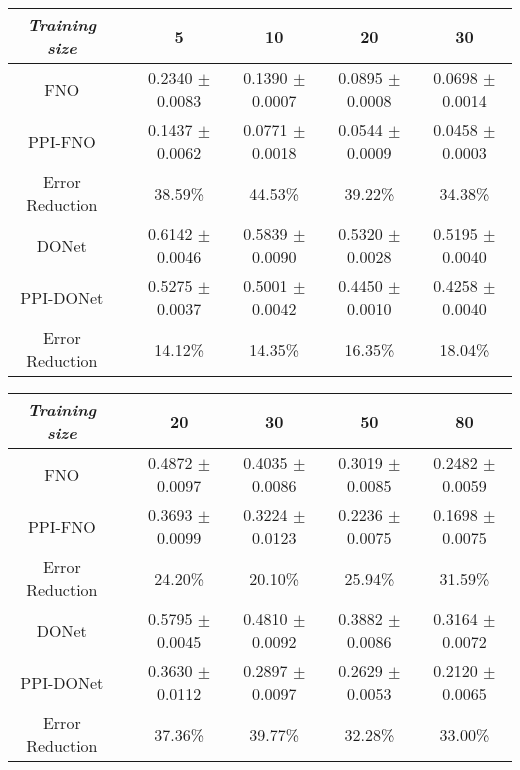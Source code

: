 \begin{table*}[t]
    \begin{subtable}{\textwidth}
    \small 
    \centering
    \begin{tabular}{cccccc}
        \hline
        \textit{Training size}      &  & {5}             & {10}         & {20}     & {30}     \\ \hline
        FNO                  &  & 0.2340 $\pm$ 0.0083	& 0.1390 $\pm$ 0.0007   & 0.0895 $\pm$ 0.0008   & 0.0698 $\pm$ 0.0014         \\
        PPI-FNO          &  & {0.1437} $\pm$ {0.0062}          & {0.0771} $\pm$ {0.0018}        & {0.0544} $\pm$ {0.0009} 		 & {0.0458} $\pm$ {0.0003}    \\
        Error Reduction          &  & 38.59\% & 44.53\%        & 39.22\%		 & 34.38\%   \\ \hline
        DONet             &  & 0.6142 $\pm$ 0.0046          & 0.5839 $\pm$ 0.0090      & 0.5320 $\pm$ 0.0028 	& 0.5195 $\pm$ 0.0040    \\
        PPI-DONet             &  & 0.5275 $\pm$ 0.0037        & 0.5001 $\pm$ 0.0042    	& 0.4450 $\pm$ 0.0010	& 0.4258 $\pm$ 0.0040  \\ 
        Error Reduction  &  & 14.12\%         & 14.35\%    	& 16.35\%	& 18.04\%  \\ \hline
    \end{tabular}
    \caption{\small \textit{Poisson}}
    \label{tab:poisson}
    \end{subtable}
    \begin{subtable}{\textwidth}
        \small 
        \centering
    \begin{tabular}{cccccc}
        \hline
        \textit{Training size}      &  & {20}             & {30}         & {50}     & {80}     \\ \hline
        FNO                  &  & 0.4872 $\pm$ 0.0097	& 0.4035 $\pm$ 0.0086   & 0.3019 $\pm$ 0.0085   & 0.2482 $\pm$ 0.0059        \\
        PPI-FNO          &  & {0.3693} $\pm$ {0.0099}          & {0.3224} $\pm$ {0.0123}        & {0.2236} $\pm$ {0.0075} 		 & {0.1698} $\pm$ {0.0075}    \\
        Error Reduction          &  & 24.20\% & 20.10\%        & 25.94\%		 & 31.59\%   \\ \hline
        DONet             &  & 0.5795 $\pm$ 0.0045          & 0.4810 $\pm$ 0.0092      & 0.3882 $\pm$ 0.0086 	& 0.3164 $\pm$ 0.0072    \\
        PPI-DONet             &  & 0.3630 $\pm$ 0.0112        & 0.2897 $\pm$ 0.0097    	& 0.2629 $\pm$ 0.0053	& 0.2120 $\pm$ 0.0065  \\ 
        Error Reduction  &  & 37.36\%         & 39.77\%    	& 32.28\%	& 33.00\%  \\ \hline
    \end{tabular}
    \caption{\small \textit{Advection}}
    \label{tab:advection}
    \end{subtable}
    

\end{table*}
